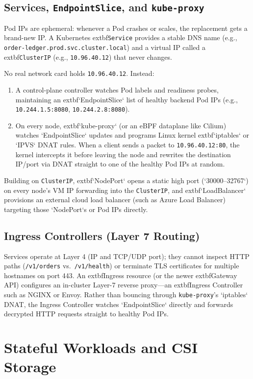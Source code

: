 \subsection{Services, \texttt{EndpointSlice}, and \texttt{kube-proxy}}
Pod IPs are ephemeral: whenever a Pod crashes or scales, the replacement gets a brand-new IP. A Kubernetes 	extbf{\texttt{Service}} provides a stable DNS name (e.g., \texttt{order-ledger.prod.svc.cluster.local}) and a virtual IP called a 	extbf{\texttt{ClusterIP}} (e.g., \texttt{10.96.40.12}) that never changes.

No real network card holds \texttt{10.96.40.12}. Instead:
\begin{enumerate}[leftmargin=15pt]
  \item A control-plane controller watches Pod labels and readiness probes, maintaining an 	extbf{`EndpointSlice`} list of healthy backend Pod IPs (e.g., \texttt{10.244.1.5:8080}, \texttt{10.244.2.8:8080}).
  \item On every node, 	extbf{`kube-proxy`} (or an eBPF dataplane like Cilium) watches `EndpointSlice` updates and programs Linux kernel 	extbf{`iptables` or `IPVS` DNAT rules}. When a client sends a packet to \texttt{10.96.40.12:80}, the kernel intercepts it before leaving the node and rewrites the destination IP/port via DNAT straight to one of the healthy Pod IPs at random.
\end{enumerate}
Building on \texttt{ClusterIP}, 	extbf{`NodePort`} opens a static high port (`30000--32767`) on every node's VM IP forwarding into the \texttt{ClusterIP}, and 	extbf{`LoadBalancer`} provisions an external cloud load balancer (such as Azure Load Balancer) targeting those `NodePort`s or Pod IPs directly.

\subsection{Ingress Controllers (Layer 7 Routing)}
Services operate at Layer 4 (IP and TCP/UDP port); they cannot inspect HTTP paths (\texttt{/v1/orders} vs.\ \texttt{/v1/health}) or terminate TLS certificates for multiple hostnames on port 443. An 	extbf{Ingress} resource (or the newer 	extbf{Gateway API}) configures an in-cluster Layer-7 reverse proxy—an 	extbf{Ingress Controller} such as NGINX or Envoy. Rather than bouncing through \texttt{kube-proxy}'s `iptables` DNAT, the Ingress Controller watches `EndpointSlice` directly and forwards decrypted HTTP requests straight to healthy Pod IPs.

\section{Stateful Workloads and CSI Storage}

